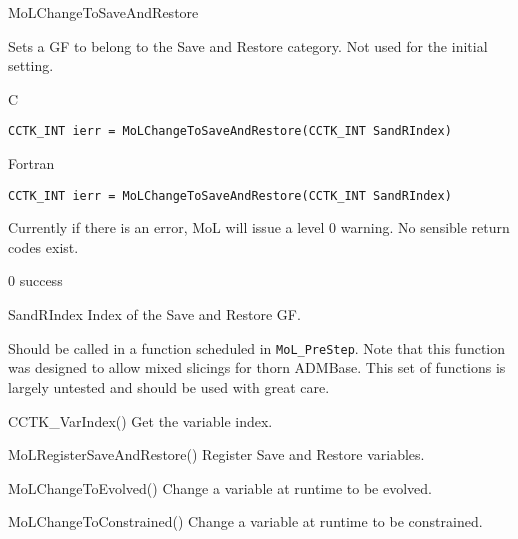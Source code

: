 \begin{FunctionDescription}{MoLChangeToSaveAndRestore}
  \label{CactusBase_MoL_MoLChangeToSaveAndRestore}
  
  Sets a GF to belong to the Save and Restore category. Not used for the
  initial setting.

  \begin{SynopsisSection}
    \begin{Synopsis}{C}
\begin{verbatim}
CCTK_INT ierr = MoLChangeToSaveAndRestore(CCTK_INT SandRIndex)      
\end{verbatim}
    \end{Synopsis}
    \begin{Synopsis}{Fortran}
\begin{verbatim}
CCTK_INT ierr = MoLChangeToSaveAndRestore(CCTK_INT SandRIndex)    
\end{verbatim}
    \end{Synopsis}
  \end{SynopsisSection}

  \begin{ResultSection}
    \begin{ResultNote}
      Currently if there is an error, MoL will issue a level 0
      warning. No sensible return codes exist.
    \end{ResultNote}
    \begin{Result}{\rm 0}
      success
    \end{Result}
  \end{ResultSection}

  \begin{ParameterSection}
    \begin{Parameter}{SandRIndex}
      Index of the Save and Restore GF.
    \end{Parameter}
  \end{ParameterSection}

  \begin{Discussion}
    Should be called in a function scheduled in {\tt MoL\_PreStep}.
    Note that this function was designed to allow mixed slicings for
    thorn ADMBase. This set of functions is largely untested and
    should be used with great care.
  \end{Discussion}

  \begin{SeeAlsoSection}
    \begin{SeeAlso}{CCTK\_VarIndex()}
      Get the variable index.
    \end{SeeAlso}
    \begin{SeeAlso}{MoLRegisterSaveAndRestore()}
      Register Save and Restore variables.
    \end{SeeAlso}
    \begin{SeeAlso}{MoLChangeToEvolved()}
      Change a variable at runtime to be evolved.
    \end{SeeAlso}
    \begin{SeeAlso}{MoLChangeToConstrained()}
      Change a variable at runtime to be constrained.
    \end{SeeAlso}
  \end{SeeAlsoSection}


\end{FunctionDescription}
